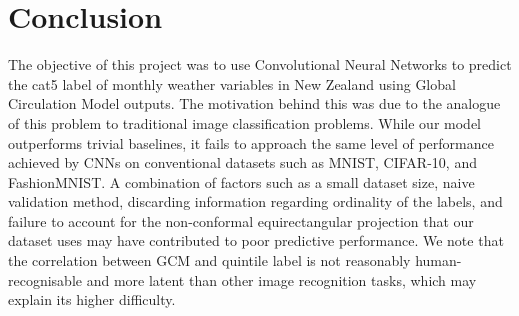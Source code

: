 \documentclass[11pt,a4paper, titlepage]{article}
\begin{document}
\section{Conclusion}
The objective of this project was to use Convolutional Neural Networks to predict the cat5 label of monthly weather variables in New Zealand using Global Circulation Model outputs. The motivation behind this was due to the analogue of this problem to traditional image classification problems. While our model outperforms trivial baselines, it fails to approach the same level of performance achieved by CNNs on conventional datasets such as MNIST, CIFAR-10, and FashionMNIST. A combination of factors such as a small dataset size, naive validation method, discarding information regarding ordinality of the labels, and failure to account for the non-conformal equirectangular projection that our dataset uses may have contributed to poor predictive performance. We note that the correlation between GCM and quintile label is not reasonably human-recognisable and more latent than other image recognition tasks, which may explain its higher difficulty.

\pagebreak



\end{document}
